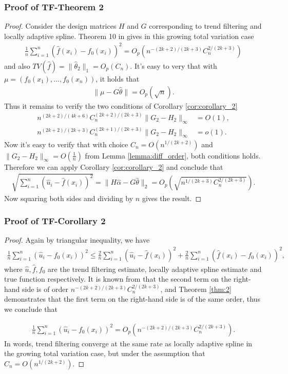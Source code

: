 \documentclass[a4paper]{article}
\begin{document}
\subsubsection{Proof of TF-Theorem 2}
\begin{proof}
Consider the design matrices $H$ and $G$ corresponding to trend filtering and locally adaptive spline. Theorem 10 in \cite{mammen1997locally} gives in this growing total variation case
\begin{align*}
\frac{1}{n}\sum_{i=1}^n(\hat{f}(x_i) - f_0(x_i))^2 = O_p(n^{-(2k+2)/(2k+3)}C_n^{2/(2k+3)})
\end{align*}
and also $TV(\hat{f}) = \|\hat{\theta}_2\|_1 = O_p(C_n)$. It's easy to very that with $\mu = (f_0(x_1),\ldots, f_0(x_n))$, it holds that
\begin{align*}
\|\mu-G\hat{\theta}\| = O_p(\sqrt{n}).
\end{align*}
Thus it remains to verify the two conditions of Corollary \ref{cor:corollary_2}
\begin{align*}
n^{(2k+2)/(4k+6)}C_n^{(2k+2)/(2k+3)}\|G_2-H_2\|_\infty &= O(1),\\
n^{(2k+2)/(2k+3)}C_n^{(2k+1)/(2k+3)}\|G_2-H_2\|_\infty &= o(1).
\end{align*}
Now it's easy to verify that with choice $C_n = O(n^{1/(2k+2)})$ and $\|G_2-H_2\|_\infty = O(\frac{1}{n})$ from Lemma \ref{lemma:diff_order}, both conditions holds. Therefore we can apply Corollary \ref{cor:corollary_2} and conclude that 
\begin{align*}
\sqrt{\sum_{i=1}^n(\hat{u}_i - \hat{f}(x_i))^2} = \|H\hat{\alpha} - G\hat{\theta}\|_2 = O_p(\sqrt{n^{1/(2k+3)}C_n^{2/(2k+3)}}).
\end{align*}
Now squaring both sides and dividing by $n$ gives the result.
\end{proof}

\subsubsection{Proof of TF-Corollary 2}
\begin{proof}
Again by triangular inequality, we have
\begin{align*}
\frac{1}{n}\sum_{i=1}^n(\hat{u}_i - f_0(x_i))^2 \leq \frac{2}{n}\sum_{i=1}^n(\hat{u}_i - \hat{f}(x_i))^2 + \frac{2}{n}\sum_{i=1}^n (\hat{f}(x_i) - f_0(x_i))^2,
\end{align*}
where $\hat{u}, \hat{f}, f_0$ are the trend filtering estimate, locally adaptive spline estimate and true function respectively. It is known from \cite{mammen1997locally} that the second term on the right-hand side is of order $n^{-(2k+2)/(2k+3)}C_n^{2/(2k+3)}$, and Theorem \ref{thm:2} demonstrates that the first term on the right-hand side is of the same order, thus we conclude that

\begin{align*}
\frac{1}{n}\sum_{i=1}^n(\hat{u}_i - f_0(x_i))^2 = O_p(n^{-(2k+2)/(2k+3)}C_n^{2/(2k+3)}).
\end{align*}
In words, trend filtering converge at the same rate as locally adaptive spline in the growing total variation case, but under the assumption that $C_n = O(n^{1/(2k+2)})$.
\end{proof}
\end{document}
